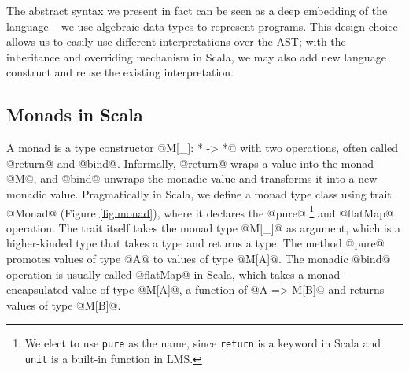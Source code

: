 The abstract syntax we present in fact can be seen as a deep embedding of the
language -- we use algebraic data-types to represent programs. This design choice allows us to
easily use different interpretations over the AST; with the inheritance and
overriding mechanism in Scala, we may also add new language construct and reuse
the existing interpretation.

\iffalse
We will give the concrete semantics using a big-step definitional
interpreter. The interpreter is a recursive function that takes the program AST,
environment, and store, and returns the evaluated value and the accompanying
store. The environment is a mapping from identifiers to addresses, and the store
is a mapping from addresses to values. We use the store to model recursion and
mutation in concrete semantics; it is also useful for polyvariant analysis. This
environment-and-store-passing style big-step interpreter is standard and can
also be obtained by refunctionalizing \cite{DBLP:conf/ppdp/AgerBDM03,
Wei:2018:RAA:3243631.3236800} a small-step CESK machine
\cite{DBLP:conf/popl/FelleisenF87}.
\fi

\subsection{Monads in Scala} \label{monadscala}

A monad is a type constructor @M[_]: * -> *@ with two operations, often called
@return@ and @bind@. Informally, @return@ wraps a value into the monad @M@, and
@bind@ unwraps the monadic value and transforms it into a new monadic value.
Pragmatically in Scala, we define a monad type class using trait @Monad@ (Figure
\ref{fig:monad}), where it declares the @pure@ \footnote{We elect to use
\texttt{pure} as the name, since \texttt{return} is a keyword in Scala and
\texttt{unit} is a built-in function in LMS.} and @flatMap@ operation. The trait
itself takes the monad type @M[_]@ as argument, which is a higher-kinded type
that takes a type and returns a type. The method @pure@ promotes values of type
@A@ to values of type @M[A]@. The monadic @bind@ operation is usually called
@flatMap@ in Scala, which takes a monad-encapsulated value of type @M[A]@, a
function of @A => M[B]@ and returns values of type @M[B]@.

